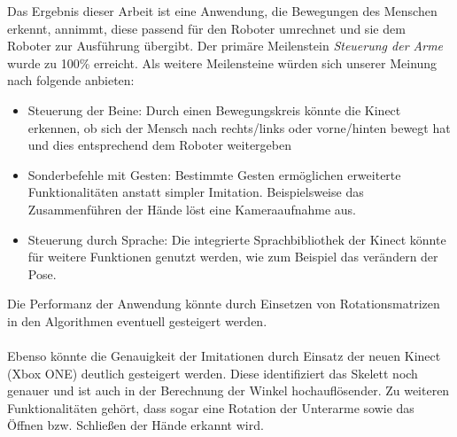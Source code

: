 \noindent
Das Ergebnis dieser Arbeit ist eine Anwendung, die Bewegungen des Menschen erkennt, annimmt, diese passend für den Roboter umrechnet und sie dem Roboter zur Ausführung übergibt. Der primäre Meilenstein \textit{Steuerung der Arme} wurde zu 100\% erreicht. Als weitere Meilensteine würden sich unserer Meinung nach folgende anbieten: 
\begin{itemize}
\item Steuerung der Beine: Durch einen Bewegungskreis könnte die Kinect erkennen, ob sich der Mensch  nach rechts/links oder vorne/hinten bewegt hat und dies entsprechend dem Roboter weitergeben
\item Sonderbefehle mit Gesten: Bestimmte Gesten ermöglichen erweiterte Funktionalitäten anstatt simpler Imitation. Beispielsweise das Zusammenführen der Hände löst eine Kameraaufnahme aus. 
\item Steuerung durch Sprache: Die integrierte Sprachbibliothek der Kinect könnte für weitere Funktionen genutzt werden, wie zum Beispiel das verändern der Pose.
\end{itemize}
Die Performanz der Anwendung könnte durch Einsetzen von Rotationsmatrizen in den Algorithmen eventuell gesteigert werden.
\\
\\
\noindent
Ebenso könnte die Genauigkeit der Imitationen durch Einsatz der neuen Kinect (Xbox ONE) deutlich gesteigert werden. Diese identifiziert das Skelett noch genauer und ist auch in der Berechnung der Winkel hochauflösender. Zu weiteren Funktionalitäten gehört, dass sogar eine Rotation der Unterarme sowie das Öffnen bzw. Schließen der Hände erkannt wird.

%


	